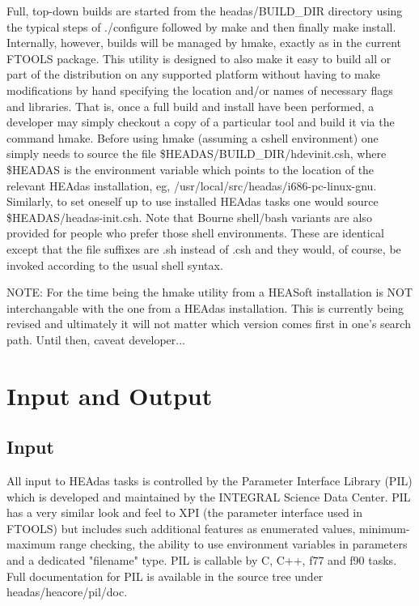 \documentclass[11pt]{book}
\begin{document}
Full, top-down builds are started from the headas/BUILD\_DIR
directory using the typical steps of ./configure followed by make
and then finally make install. Internally, however, builds will be
managed by hmake, exactly as in the current FTOOLS package.
This utility is designed to also make it easy to build all or part of the
distribution on any supported platform without having to make
modifications by hand specifying the location and/or names of
necessary flags and libraries. That is, once a full build and install
have been performed, a developer may simply checkout a copy of
a particular tool and build it via the command hmake. Before using
hmake (assuming a cshell environment) one simply needs to
source the file \$HEADAS/BUILD\_DIR/hdevinit.csh, where
\$HEADAS is the environment variable which points to the location of
the relevant HEAdas installation, eg,
/usr/local/src/headas/i686-pc-linux-gnu. Similarly, to set
oneself up to use installed HEAdas tasks one would source
\$HEADAS/headas-init.csh. Note that Bourne shell/bash variants
are also provided for people who prefer those shell environments.
These are identical except that the file suffixes are .sh instead of
.csh and they would, of course, be invoked according to the usual
shell syntax.

NOTE: For the time being the hmake utility from a HEASoft
installation is NOT interchangable with the one from a HEAdas
installation. This is currently being revised and ultimately it will not
matter which version comes first in one's search path. Until then,
caveat developer...

\section{Input and Output}
\subsection{Input}

All input to HEAdas tasks is controlled by the Parameter
Interface Library (PIL) which is developed and maintained by the
INTEGRAL Science Data Center. PIL has a very similar look
and feel to XPI (the parameter interface used in FTOOLS) but
includes such additional features as enumerated values,
minimum-maximum range checking, the ability to use
environment variables in parameters and a dedicated "filename"
type. PIL is callable by C, C++, f77 and f90 tasks. Full
documentation for PIL is available in the source tree under
headas/heacore/pil/doc.
\end{document}
